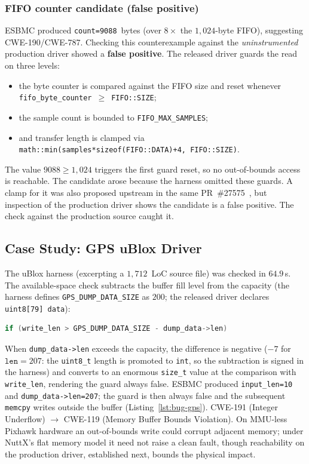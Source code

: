 \documentclass[conference]{IEEEtran}
\newcommand{\entra}[1]{#1}
\begin{document}
\subsubsection{FIFO counter candidate (false positive)}
ESBMC produced \texttt{count=9088}~bytes (over $8\times$ the
$1{,}024$-byte FIFO), suggesting CWE-190/CWE-787.
Checking this counterexample against the
\emph{uninstrumented} production driver showed a \textbf{false
positive}. The released driver guards the read on three levels:
\begin{itemize}
  \item the byte counter is compared against the FIFO size and reset
        whenever \texttt{fifo\_byte\_counter}~$\geq$~\texttt{FIFO::SIZE};
  \item the sample count is bounded to \texttt{FIFO\_MAX\_SAMPLES};
  \item and transfer length is clamped via\\
        \texttt{math::min(samples*sizeof(FIFO::DATA)+4, FIFO::SIZE)}.
\end{itemize}
The value $9088\geq1{,}024$ triggers the first guard reset,
so no out-of-bounds access is reachable. The candidate arose
because the harness omitted these guards. A clamp for it was also
proposed upstream in the same PR~\#27575~\cite{PX4_PR27575}, but inspection of
the production driver shows the candidate is a false positive. The
check against the production source caught it.

\subsection{Case Study: GPS uBlox Driver}
\label{subsec:case-gps}

The uBlox harness (excerpting a $1{,}712$~LoC source file) was checked in $64.9$\,s.
The available-space check subtracts the buffer fill level from the capacity (the harness defines \texttt{GPS\_DUMP\_DATA\_SIZE} as $200$; the released driver declares \texttt{uint8[79]~data}):
\begin{lstlisting}[language=C]
if (write_len > GPS_DUMP_DATA_SIZE - dump_data->len)
\end{lstlisting}
When \texttt{dump\_data->len} exceeds the capacity, the difference is negative ($-7$ for $\texttt{len}=207$: the \texttt{uint8\_t} length is promoted to \texttt{int}, so the subtraction is signed in the harness) and converts to an enormous \texttt{size\_t} value at the comparison with \texttt{write\_len}, rendering the guard always false.
ESBMC produced \texttt{input\_len=10} and
\texttt{dump\_data->len=207}; the guard is then always false and the
subsequent \texttt{memcpy} writes outside the buffer (Listing~\ref{lst:bug-gps}).
CWE-191 (Integer Underflow) $\to$ CWE-119
(Memory Buffer Bounds Violation).
On MMU-less Pixhawk hardware an out-of-bounds write could corrupt
adjacent memory; under NuttX's flat memory model it need not raise a
clean fault\entra{, though reachability on the production driver,
established next, bounds the physical
impact.}
\end{document}
